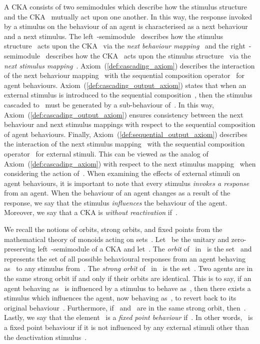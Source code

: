 \documentclass[copyright,creativecommons]{eptcs}
\makeatletter
\newcommand{\CKAabbrv}{CKA\@\xspace}
\newcommand{\cka}{{\cal K}}
\newcommand{\stim}{{\cal S}}
\newcommand{\rightSemimodule}[1]{right~-semimodule\@\xspace}
\newcommand{\leftSemimodule}[1]{left~-semimodule\@\xspace}
\newcommand{\CCKAabbrv}{CKA\@\xspace}
\makeatother
\begin{document}
A \CCKAabbrv consists of two semimodules which describe how the stimulus structure~ and the \CKAabbrv~ mutually act upon one another. In this way, the response invoked by a stimulus on the behaviour of an agent is characterised as a next behaviour and a next stimulus. The \leftSemimodule{\stim}~ describes how the stimulus structure~ acts upon the \CKAabbrv~ via the \emph{next behaviour mapping}~ and the \rightSemimodule{\cka}~ describes how the \CKAabbrv~ acts upon the stimulus structure~ via the \emph{next stimulus mapping}~. Axiom~(\ref{def:cascading_axiom}) describes the interaction of the next behaviour mapping~ with the sequential composition operator~ for agent behaviours. Axiom~(\ref{def:cascading_output_axiom}) states that when an external stimulus is introduced to the sequential composition~, then the stimulus cascaded to~ must be generated by a sub-behaviour of~. In this way, Axiom~(\ref{def:cascading_output_axiom}) ensures consistency between the next behaviour and next stimulus mappings with respect to the sequential composition of agent behaviours. Finally, Axiom~(\ref{def:sequential_output_axiom}) describes the interaction of the next stimulus mapping~ with the sequential composition operator~ for external stimuli. This can be viewed as the analog of Axiom~(\ref{def:cascading_axiom}) with respect to the next stimulus mapping~ when considering the action of~. When examining the effects of external stimuli on agent behaviours, it is important to note that every stimulus \emph{invokes a response} from an agent. When the behaviour of an agent changes as a result of the response, we say that the stimulus \emph{influences} the behaviour of the agent. Moreover, we say that a \CCKAabbrv is \emph{without reactivation} if~.

We recall the notions of orbits, strong orbits, and fixed points from the mathematical theory of monoids acting on sets~\cite{Kilp2000aa}. Let~ be the unitary and zero-preserving \leftSemimodule{\stim} of a \CCKAabbrv and let~. The \emph{orbit} of~ in~ is the set~ and represents the set of all possible behavioural responses from an agent behaving as~ to any stimulus from~.
The \emph{strong orbit} of~ in~ is the set~. Two agents are in the same strong orbit if and only if their orbits are identical. This is to say, if an agent behaving as~ is influenced by a stimulus to behave as~, then there exists a stimulus which influences the agent, now behaving as~, to revert back to its original behaviour~. Furthermore, if~ and~ are in the same strong orbit, then~. Lastly, we say that the element~ is a \emph{fixed point behaviour} if~. In other words,~ is a fixed point behaviour if it is not influenced by any external stimuli other than the deactivation stimulus~.
\end{document}
